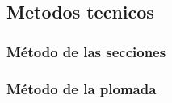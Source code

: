 \documentclass[16pt,]{krantz}
\theoremstyle{definition}
\theoremstyle{definition}
\theoremstyle{definition}
\theoremstyle{definition}
\theoremstyle{remark}
\begin{document}
\hypertarget{metodos-tecnicos-1}{%
\subsection{Metodos tecnicos}\label{metodos-tecnicos-1}}

\hypertarget{muxe9todo-de-las-secciones}{%
\subsubsection{Método de las secciones}\label{muxe9todo-de-las-secciones}}

\hypertarget{muxe9todo-de-la-plomada-1}{%
\subsubsection{Método de la plomada}\label{muxe9todo-de-la-plomada-1}}



\printindex
\end{document}
